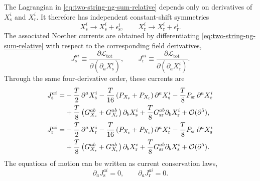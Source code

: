 \documentclass[%
preprint,
amsmath,amssymb,
aps,
prd,
10pt
]{revtex4-2}
\begin{document}
The Lagrangian in \eqref{eq:two-string-ng-sum-relative} depends only on
derivatives of $X_{\mathrm{s}}^i$ and $X_{\mathrm{r}}^i$.  It therefore has
independent constant-shift symmetries
\begin{equation}
  X_{\mathrm{s}}^i \to X_{\mathrm{s}}^i+\epsilon_{\mathrm{s}}^i,
  \qquad
  X_{\mathrm{r}}^i \to X_{\mathrm{r}}^i+\epsilon_{\mathrm{r}}^i .
\end{equation}
The associated Noether currents are obtained by differentiating
\eqref{eq:two-string-ng-sum-relative} with respect to the corresponding field
derivatives,
\begin{equation}
  J_{\mathrm{s}}^{a i}
  \equiv
  \frac{\partial\mathcal{L}_{\mathrm{tot}}}
       {\partial(\partial_a X_{\mathrm{s}}^i)},
  \qquad
  J_{\mathrm{r}}^{a i}
  \equiv
  \frac{\partial\mathcal{L}_{\mathrm{tot}}}
       {\partial(\partial_a X_{\mathrm{r}}^i)} .
\end{equation}
Through the same four-derivative order, these currents are
\begin{align}
  J_{\mathrm{s}}^{a i}
  =
  &-\frac{T}{2}\,\partial^a X_{\mathrm{s}}^i
  -\frac{T}{16}
    \left(P_{X_{\mathrm{s}}}+P_{X_{\mathrm{r}}}\right)
    \partial^a X_{\mathrm{s}}^i
  -\frac{T}{8}P_{\mathrm{sr}}\,
    \partial^a X_{\mathrm{r}}^i
  \notag\\
  &+\frac{T}{8}
    \left(G_{X_{\mathrm{s}}}^{ab}+G_{X_{\mathrm{r}}}^{ab}\right)
    \partial_b X_{\mathrm{s}}^i
  +\frac{T}{8}
    G_{\mathrm{sr}}^{ab}\partial_b X_{\mathrm{r}}^i
  +\mathcal{O}(\partial^5),
  \label{eq:shift-current-sum}
  \\
  J_{\mathrm{r}}^{a i}
  =
  &-\frac{T}{2}\,\partial^a X_{\mathrm{r}}^i
  -\frac{T}{16}
    \left(P_{X_{\mathrm{s}}}+P_{X_{\mathrm{r}}}\right)
    \partial^a X_{\mathrm{r}}^i
  -\frac{T}{8}P_{\mathrm{sr}}\,
    \partial^a X_{\mathrm{s}}^i
  \notag\\
  &+\frac{T}{8}
    \left(G_{X_{\mathrm{s}}}^{ab}+G_{X_{\mathrm{r}}}^{ab}\right)
    \partial_b X_{\mathrm{r}}^i
  +\frac{T}{8}
    G_{\mathrm{sr}}^{ab}\partial_b X_{\mathrm{s}}^i
  +\mathcal{O}(\partial^5).
  \label{eq:shift-current-relative}
\end{align}
The equations of motion can be written as current conservation laws,
\begin{equation}
  \partial_a J_{\mathrm{s}}^{a i}=0,
  \qquad
  \partial_a J_{\mathrm{r}}^{a i}=0.
\end{equation}






\end{document}
